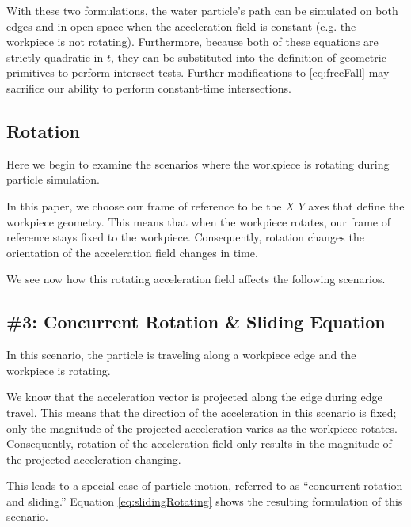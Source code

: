 

With these two formulations, the water particle's path can be simulated on both edges and in open space when the acceleration field is constant (e.g. the workpiece is not rotating). Furthermore, because both of these equations are strictly quadratic in $t$, they can be substituted into the definition of geometric primitives to perform intersect tests. Further modifications to \eqref{eq:freeFall} may sacrifice our ability to perform constant-time intersections.

		\subsection{Rotation}

Here we begin to examine the scenarios where the workpiece is rotating during particle simulation.

In this paper, we choose our frame of reference to be the $X$ $Y$ axes that define the workpiece geometry. This means that when the workpiece rotates, our frame of reference stays fixed to the workpiece. Consequently, rotation changes the orientation of the acceleration field changes in time.

We see now how this rotating acceleration field affects the following scenarios.

		\subsection{\#3: Concurrent Rotation \& Sliding Equation}

In this scenario, the particle is traveling along a workpiece edge and the workpiece is rotating.

We know that the acceleration vector is projected along the edge during edge travel. This means that the direction of the acceleration in this scenario is fixed; only the magnitude of the projected acceleration varies as the workpiece rotates. Consequently, rotation of the acceleration field only results in the magnitude of the projected acceleration changing.

This leads to a special case of particle motion, referred to as ``concurrent rotation and sliding.'' Equation \eqref{eq:slidingRotating} shows the resulting formulation of this scenario.

